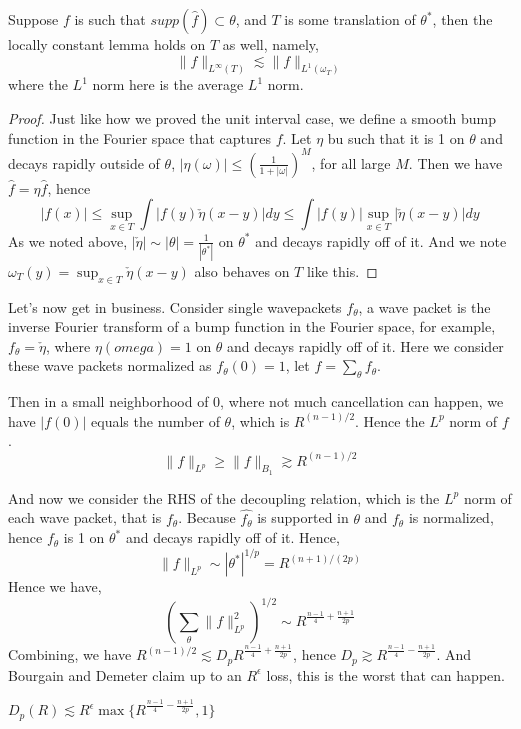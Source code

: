 \begin{lemma}
    Suppose $f$ is such that $supp(\widehat{f})\subset\theta$, and $T$ is some translation of $\theta^*$, then the locally constant lemma holds on $T$ as well, namely,
    \begin{equation*}
        \|f\|_{L^\infty(T)}\lesssim \|f\|_{L^1(\omega_T)}
    \end{equation*}
    where the $L^1$ norm here is the average $L^1$ norm.
\end{lemma}
\begin{proof}
    Just like how we proved the unit interval case, we define a smooth bump function in the Fourier space that captures $f$. Let $\eta$ bu such that it is 1 on $\theta$ and decays rapidly outside of $\theta$, $|\eta(\omega)|\leq\left(\frac{1}{1+|\omega|} \right)^M$, for all large $M$. Then we have $\widehat{f}=\eta\widehat{f}$, hence \begin{equation*}
        |f(x)|\leq\sup_{x\in T}\int|f(y)\check{\eta}(x-y)|dy\leq \int|f(y)|\sup_{x\in T}|\check{\eta}(x-y)|dy
    \end{equation*}
    As we noted above, $|\check{\eta}|\sim |\theta|=\frac{1}{|\theta^*|}$ on $\theta^*$ and decays rapidly off of it. And we note $\omega_T(y)=\sup_{x\in T}\check{\eta}(x-y)$ also behaves on $T$ like this.
\end{proof}

Let's now get in business. Consider single wavepackets $f_\theta$, a wave packet is the inverse Fourier transform of a bump function in the Fourier space, for example, $f_\theta=\check{\eta}$, where $\eta(omega)=1$ on $\theta$ and decays rapidly off of it. Here we consider these wave packets normalized as $f_\theta(0)=1$, let $f=\sum_\theta f_\theta$.

Then in a small neighborhood of $0$, where not much cancellation can happen, we have $|f(0)|$ equals the number of $\theta$, which is $R^{(n-1)/2}$. Hence the $L^p$ norm of $f$.
\begin{equation*}
    \|f\|_{L^p}\geq \|f\|_{B_1}\gtrsim R^{(n-1)/2}
\end{equation*}

And now we consider the RHS of the decoupling relation, which is the $L^p$ norm of each wave packet, that is $f_\theta$. Because $\widehat{f_\theta}$ is supported in $\theta$ and $f_\theta$ is normalized, hence $f_\theta$ is 1 on $\theta^*$ and decays rapidly off of it. Hence,
\begin{equation*}
    \|f\|_{L^p}\sim |\theta^*|^{1/p}=R^{(n+1)/(2p)}
\end{equation*}
Hence we have,
\begin{equation*}
    \left(\sum_\theta\|f\|_{L^p}^2\right)^{1/2}\sim R^{\frac{n-1}{4}+\frac{n+1}{2p}}
\end{equation*}
Combining, we have $R^{(n-1)/2}\lesssim D_p R^{\frac{n-1}{4}+\frac{n+1}{2p}}$, hence $D_p\gtrsim R^{\frac{n-1}{4}-\frac{n+1}{2p}}$. And Bourgain and Demeter claim up to an $R^\epsilon$ loss, this is the worst that can happen.

\begin{theorem}
    $D_p(R)\lesssim R^\epsilon \max\{R^{\frac{n-1}{4}-\frac{n+1}{2p}},1\}$
\end{theorem}


